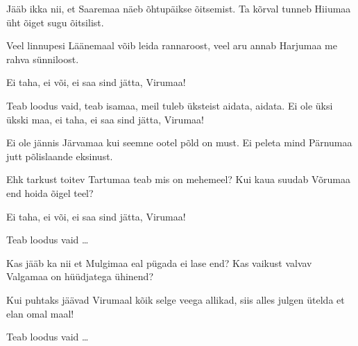 J\"a\"ab ikka nii, et Saaremaa
n\"aeb \~ohtup\"aikse \~oitsemist.
Ta k\~orval tunneb Hiiumaa
\"uht \~oiget sugu \~oitsilist.

Veel linnupesi L\"a\"anemaal
v\~oib leida rannaroost,
veel aru annab Harjumaa
me rahva s\"unniloost.

Ei taha, ei v\~oi, ei saa sind j\"atta, Virumaa!

Teab loodus vaid, teab isamaa,
meil tuleb \"uksteist aidata, aidata.
Ei ole \"uksi \"ukski maa,
ei taha, ei saa sind j\"atta, Virumaa!

Ei ole j\"annis J\"arvamaa
kui seemne ootel p\~old on must.
Ei peleta mind P\"arnumaa
jutt p\~olislaande eksinust.

Ehk tarkust toitev Tartumaa
teab mis on mehemeel?
Kui kaua suudab V\~orumaa
end hoida \~oigel teel?

Ei taha, ei v\~oi, ei saa sind j\"atta, Virumaa!

Teab loodus vaid \ldots

Kas j\"a\"ab ka nii et Mulgimaa
eal p\"ugada ei lase end?
Kas vaikust valvav Valgamaa
on h\"u\"udjatega \"uhinend?

Kui puhtaks j\"a\"avad Virumaal
k\~oik selge veega allikad,
siis alles julgen \"utelda
et elan omal maal!

Teab loodus vaid \ldots